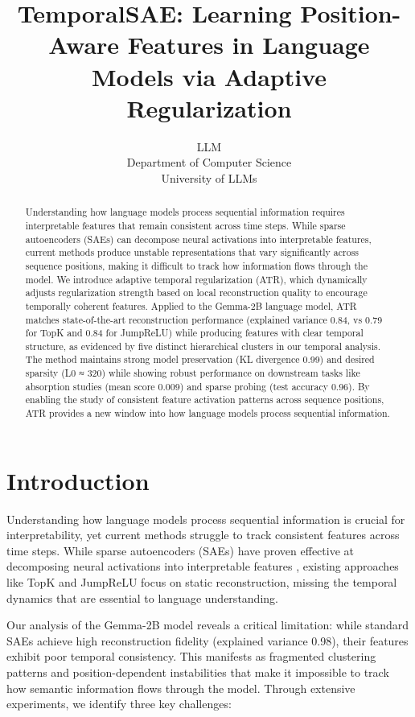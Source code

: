 \documentclass{article} %
\title{TemporalSAE: Learning Position-Aware Features in Language Models via Adaptive Regularization}
\author{LLM\\
Department of Computer Science\\
University of LLMs\\
}
\begin{document}
\maketitle

\begin{abstract}
Understanding how language models process sequential information requires interpretable features that remain consistent across time steps. While sparse autoencoders (SAEs) can decompose neural activations into interpretable features, current methods produce unstable representations that vary significantly across sequence positions, making it difficult to track how information flows through the model. We introduce adaptive temporal regularization (ATR), which dynamically adjusts regularization strength based on local reconstruction quality to encourage temporally coherent features. Applied to the Gemma-2B language model, ATR matches state-of-the-art reconstruction performance (explained variance 0.84, vs 0.79 for TopK and 0.84 for JumpReLU) while producing features with clear temporal structure, as evidenced by five distinct hierarchical clusters in our temporal analysis. The method maintains strong model preservation (KL divergence 0.99) and desired sparsity (L0 ≈ 320) while showing robust performance on downstream tasks like absorption studies (mean score 0.009) and sparse probing (test accuracy 0.96). By enabling the study of consistent feature activation patterns across sequence positions, ATR provides a new window into how language models process sequential information.
\end{abstract}

\section{Introduction}
\label{sec:intro}

Understanding how language models process sequential information is crucial for interpretability, yet current methods struggle to track consistent features across time steps. While sparse autoencoders (SAEs) have proven effective at decomposing neural activations into interpretable features \cite{gaoScalingEvaluatingSparse}, existing approaches like TopK \cite{bussmannBatchTopKSparseAutoencoders2024} and JumpReLU \cite{rajamanoharanJumpingAheadImproving2024} focus on static reconstruction, missing the temporal dynamics that are essential to language understanding.

Our analysis of the Gemma-2B model reveals a critical limitation: while standard SAEs achieve high reconstruction fidelity (explained variance 0.98), their features exhibit poor temporal consistency. This manifests as fragmented clustering patterns and position-dependent instabilities that make it impossible to track how semantic information flows through the model. Through extensive experiments, we identify three key challenges:
\end{document}
